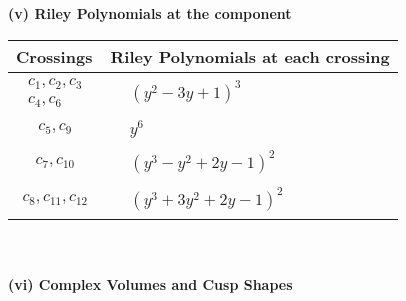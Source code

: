 \documentclass[1p]{elsarticle_modified}
\theoremstyle{definition}
\begin{document}
\newpage\renewcommand{\arraystretch}{1}
\flushleft \textbf{(v) Riley Polynomials at the component}\newline \\
\begin{tabular}{m{50pt}|m{274pt}}
Crossings & \hspace{64pt}Riley Polynomials at each crossing \\
\hline $$\begin{aligned}c_{1},c_{2},c_{3}\\c_{4},c_{6}\end{aligned}$$&$\begin{aligned}
&(y^2-3 y+1)^3
\end{aligned}$\\
\hline $$\begin{aligned}c_{5},c_{9}\end{aligned}$$&$\begin{aligned}
&y^6
\end{aligned}$\\
\hline $$\begin{aligned}c_{7},c_{10}\end{aligned}$$&$\begin{aligned}
&(y^3- y^2+2 y-1)^2
\end{aligned}$\\
\hline $$\begin{aligned}c_{8},c_{11},c_{12}\end{aligned}$$&$\begin{aligned}
&(y^3+3 y^2+2 y-1)^2
\end{aligned}$\\
\hline
\end{tabular}\\~\\
\newpage\flushleft \textbf{(vi) Complex Volumes and Cusp Shapes}
\end{document}
